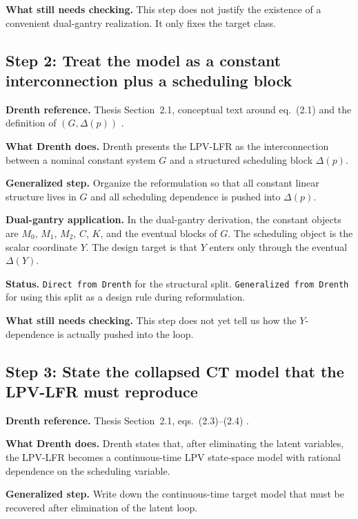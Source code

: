 ﻿\documentclass[11pt]{article}
\newcommand{\audititem}[2]{\par\smallskip\noindent\textbf{#1.} #2\par}
\newcommand{\statusline}[1]{\texttt{#1}}
\begin{document}
\audititem{What still needs checking}{This step does not justify the existence
of a convenient dual-gantry realization. It only fixes the target class.}

\subsection{Step 2: Treat the model as a constant interconnection plus a scheduling block}

\audititem{Drenth reference}{Thesis Section~2.1, conceptual text around
eq.~(2.1) and the definition of $(G,\Delta(p))$ \cite{drenth2025thesis}.}

\audititem{What Drenth does}{Drenth presents the LPV-LFR as the interconnection
between a nominal constant system $G$ and a structured scheduling block
$\Delta(p)$.}

\audititem{Generalized step}{Organize the reformulation so that all constant
linear structure lives in $G$ and all scheduling dependence is pushed into
$\Delta(p)$.}

\audititem{Dual-gantry application}{In the dual-gantry derivation, the constant
objects are $M_0$, $M_1$, $M_2$, $C$, $K$, and the eventual blocks of $G$.
The scheduling object is the scalar coordinate $Y$. The design target is that
$Y$ enters only through the eventual $\Delta(Y)$.}

\audititem{Status}{\statusline{Direct from Drenth} for the structural split.
\statusline{Generalized from Drenth} for using this split as a design rule
during reformulation.}

\audititem{What still needs checking}{This step does not yet tell us how the
$Y$-dependence is actually pushed into the loop.}

\subsection{Step 3: State the collapsed CT model that the LPV-LFR must reproduce}

\audititem{Drenth reference}{Thesis Section~2.1, eqs.~(2.3)--(2.4)
\cite{drenth2025thesis}.}

\audititem{What Drenth does}{Drenth states that, after eliminating the latent
variables, the LPV-LFR becomes a continuous-time LPV state-space model with
rational dependence on the scheduling variable.}

\audititem{Generalized step}{Write down the continuous-time target model that
must be recovered after elimination of the latent loop.}
\end{document}
